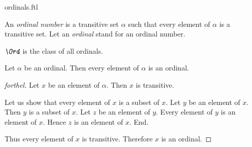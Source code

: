 \documentclass{stex}
\begin{document}
\begin{smodule}{ordinals.ftl}

\begin{definition}[forthel,for={ordinal number,ordinal}]
  An \emph{ordinal number} is a transitive set $\alpha$ such that every element of $\alpha$ is a transitive set.
  Let an \emph{ordinal} stand for an ordinal number.
\end{definition}

\begin{definition}[forthel,for=Ord]
  $\emph{\Ord}$ is the class of all ordinals.
\end{definition}

\begin{proposition}[forthel]
  Let $\alpha$ be an ordinal.
  Then every element of $\alpha$ is an ordinal.
\end{proposition}
\begin{proof}[forthel]
  Let $x$ be an element of $\alpha$.
  Then $x$ is transitive.

  Let us show that every element of $x$ is a subset of $x$.
    Let $y$ be an element of $x$.
    Then $y$ is a subset of $x$.
    Let $z$ be an element of $y$.
    Every element of $y$ is an element of $x$.
    Hence $z$ is an element of $x$.
  End.

  Thus every element of $x$ is transitive.
  Therefore $x$ is an ordinal.
\end{proof}
\end{smodule}
\end{document}
